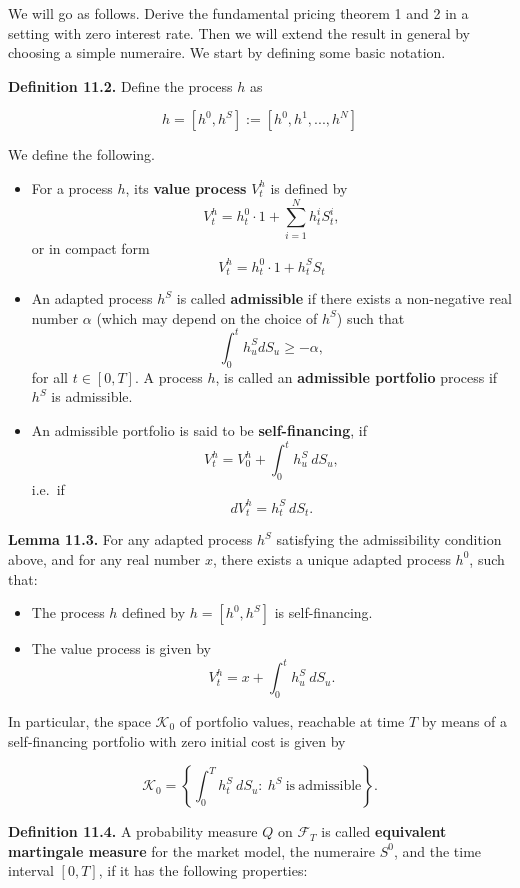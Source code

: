 \documentclass[
]{article}
\providecommand{\tightlist}{%
  \setlength{\itemsep}{0pt}\setlength{\parskip}{0pt}}
\begin{document}
We will go as follows. Derive the fundamental pricing theorem 1 and 2 in
a setting with zero interest rate. Then we will extend the result in
general by choosing a simple numeraire. We start by defining some basic
notation.

\textbf{Definition 11.2.} Define the process \(h\) as

\[
h=[h^0,h^S]:=[h^0,h^1,...,h^N]
\]

We define the following.

\begin{itemize}
\tightlist
\item
  For a process \(h\), its \textbf{value process} \(V_t^h\) is defined
  by \[
    V_t^h=h^0_t\cdot 1+\sum_{i=1}^Nh_t^iS_t^i,
    \] or in compact form \[
    V_t^h=h_t^0\cdot 1 + h_t^S S_t
    \]
\item
  An adapted process \(h^S\) is called \textbf{admissible} if there
  exists a non-negative real number \(\alpha\) (which may depend on the
  choice of \(h^S\)) such that \[
    \int_0^th_u^SdS_u\ge -\alpha,
    \] for all \(t\in[0,T]\). A process \(h\), is called an
  \textbf{admissible portfolio} process if \(h^S\) is admissible.
\item
  An admissible portfolio is said to be \textbf{self-financing}, if \[
    V_t^h=V_0^h+\int_0^th_u^S\ dS_u,
    \] i.e.~if \[
    dV_t^h=h_t^S\ dS_t.
    \]
\end{itemize}

\textbf{Lemma 11.3.} For any adapted process \(h^S\) satisfying the
admissibility condition above, and for any real number \(x\), there
exists a unique adapted process \(h^0\), such that:

\begin{itemize}
\tightlist
\item
  The process \(h\) defined by \(h=[h^0,h^S]\) is self-financing.
\item
  The value process is given by \[
    V_t^h=x+\int_0^th_u^S\ dS_u.
    \]
\end{itemize}

In particular, the space \(\mathcal{K}_0\) of portfolio values,
reachable at time \(T\) by means of a self-financing portfolio with zero
initial cost is given by

\[
\mathcal{K}_0=\left\{\int_0^Th_t^S\ dS_u :\ h^S\ \text{is}\ \text{admissible}\right\}.
\]

\textbf{Definition 11.4.} A probability measure \(Q\) on
\(\mathcal{F}_T\) is called \textbf{equivalent martingale measure} for
the market model, the numeraire \(S^0\), and the time interval
\([0,T]\), if it has the following properties:
\end{document}
